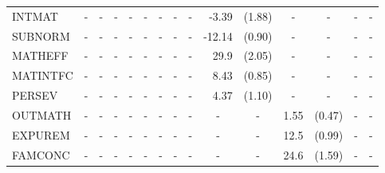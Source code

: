 \documentclass[12pt]{article}%
\begin{document}
\begin{table}[H]
\begin{tabular}{lrlrlrlrlrlrlrl}
			INTMAT & \multicolumn{1}{c}{-} & \multicolumn{1}{c}{-} & \multicolumn{1}{c}{-} & \multicolumn{1}{c}{-} & \multicolumn{1}{c}{-} & \multicolumn{1}{c}{-} & \multicolumn{1}{c}{-} & \multicolumn{1}{c}{-} & -3.39 & (1.88) & \multicolumn{1}{c}{-} & \multicolumn{1}{c}{-} & \multicolumn{1}{c}{-} & \multicolumn{1}{c}{-} \\[0.2em]
			SUBNORM & \multicolumn{1}{c}{-} & \multicolumn{1}{c}{-} & \multicolumn{1}{c}{-} & \multicolumn{1}{c}{-} & \multicolumn{1}{c}{-} & \multicolumn{1}{c}{-} & \multicolumn{1}{c}{-} & \multicolumn{1}{c}{-} & -12.14 & (0.90) & \multicolumn{1}{c}{-} & \multicolumn{1}{c}{-} & \multicolumn{1}{c}{-} & \multicolumn{1}{c}{-} \\[0.2em]
			MATHEFF & \multicolumn{1}{c}{-} & \multicolumn{1}{c}{-} & \multicolumn{1}{c}{-} & \multicolumn{1}{c}{-} & \multicolumn{1}{c}{-} & \multicolumn{1}{c}{-} & \multicolumn{1}{c}{-} & \multicolumn{1}{c}{-} & 29.9  & (2.05) & \multicolumn{1}{c}{-} & \multicolumn{1}{c}{-} & \multicolumn{1}{c}{-} & \multicolumn{1}{c}{-} \\[0.2em]
			MATINTFC & \multicolumn{1}{c}{-} & \multicolumn{1}{c}{-} & \multicolumn{1}{c}{-} & \multicolumn{1}{c}{-} & \multicolumn{1}{c}{-} & \multicolumn{1}{c}{-} & \multicolumn{1}{c}{-} & \multicolumn{1}{c}{-} & 8.43  & (0.85) & \multicolumn{1}{c}{-} & \multicolumn{1}{c}{-} & \multicolumn{1}{c}{-} & \multicolumn{1}{c}{-} \\[0.2em]
			PERSEV & \multicolumn{1}{c}{-} & \multicolumn{1}{c}{-} & \multicolumn{1}{c}{-} & \multicolumn{1}{c}{-} & \multicolumn{1}{c}{-} & \multicolumn{1}{c}{-} & \multicolumn{1}{c}{-} & \multicolumn{1}{c}{-} & 4.37  & (1.10) & \multicolumn{1}{c}{-} & \multicolumn{1}{c}{-} & \multicolumn{1}{c}{-} & \multicolumn{1}{c}{-} \\[0.2em]
			OUTMATH & \multicolumn{1}{c}{-} & \multicolumn{1}{c}{-} & \multicolumn{1}{c}{-} & \multicolumn{1}{c}{-} & \multicolumn{1}{c}{-} & \multicolumn{1}{c}{-} & \multicolumn{1}{c}{-} & \multicolumn{1}{c}{-} & \multicolumn{1}{c}{-} & \multicolumn{1}{c}{-} & 1.55  & (0.47) & \multicolumn{1}{c}{-} & \multicolumn{1}{c}{-} \\[0.2em]
			EXPUREM & \multicolumn{1}{c}{-} & \multicolumn{1}{c}{-} & \multicolumn{1}{c}{-} & \multicolumn{1}{c}{-} & \multicolumn{1}{c}{-} & \multicolumn{1}{c}{-} & \multicolumn{1}{c}{-} & \multicolumn{1}{c}{-} & \multicolumn{1}{c}{-} & \multicolumn{1}{c}{-} & 12.5  & (0.99) & \multicolumn{1}{c}{-} & \multicolumn{1}{c}{-} \\[0.2em]
			FAMCONC & \multicolumn{1}{c}{-} & \multicolumn{1}{c}{-} & \multicolumn{1}{c}{-} & \multicolumn{1}{c}{-} & \multicolumn{1}{c}{-} & \multicolumn{1}{c}{-} & \multicolumn{1}{c}{-} & \multicolumn{1}{c}{-} & \multicolumn{1}{c}{-} & \multicolumn{1}{c}{-} & 24.6  & (1.59) & \multicolumn{1}{c}{-} & \multicolumn{1}{c}{-} \\[0.2em]

\end{tabular}
\end{table}
\end{document}
